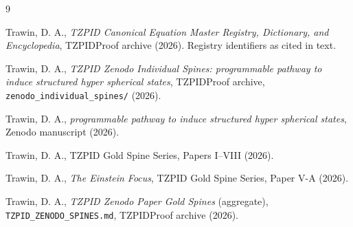 \documentclass[11pt]{article}
\theoremstyle{remark}
\begin{document}
\begin{thebibliography}{9}

 Trawin, D. A., \emph{TZPID Canonical Equation Master Registry, Dictionary, and Encyclopedia}, TZPIDProof archive (2026). Registry identifiers as cited in text.

 Trawin, D. A., \emph{TZPID Zenodo Individual Spines: programmable pathway to induce structured hyper spherical states}, TZPIDProof archive, \texttt{zenodo\_individual\_spines/} (2026).

 Trawin, D. A., \emph{programmable pathway to induce structured hyper spherical states}, Zenodo manuscript (2026).

 Trawin, D. A., TZPID Gold Spine Series, Papers I--VIII (2026).

 Trawin, D. A., \emph{The Einstein Focus}, TZPID Gold Spine Series, Paper V-A (2026).

 Trawin, D. A., \emph{TZPID Zenodo Paper Gold Spines} (aggregate), \texttt{TZPID\_ZENODO\_SPINES.md}, TZPIDProof archive (2026).

\end{thebibliography}
\end{document}
